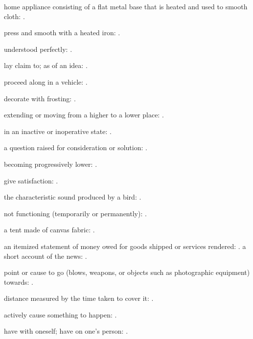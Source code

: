   home appliance consisting of a flat metal base that is heated and used to smooth cloth:   .

  press and smooth with a heated iron:   .

  understood perfectly:   .

  lay claim to; as of an idea:   .

  proceed along in a vehicle:   .

  decorate with frosting:   .

  extending or moving from a higher to a lower place:   .

  in an inactive or inoperative state: .

  a question raised for consideration or solution: .

  becoming progressively lower: .

  give satisfaction: .

  the characteristic sound produced by a bird:   .

  not functioning (temporarily or permanently): .

  a tent made of canvas fabric:   .

  an itemized statement of money owed for goods shipped or services rendered:   . a short account of the news:   .

  point or cause to go (blows, weapons, or objects such as photographic equipment) towards:   .

  distance measured by the time taken to cover it:   .

  actively cause something to happen: .

  have with oneself; have on one's person:   .

